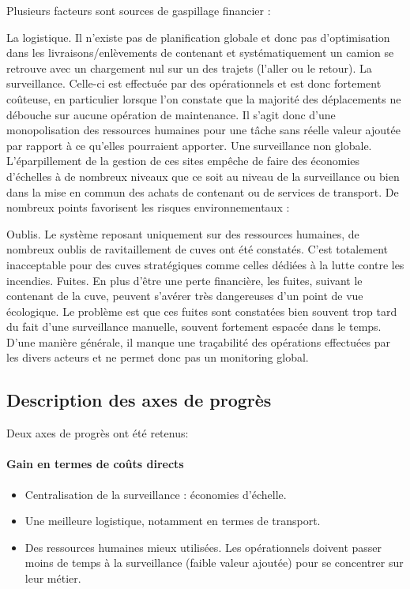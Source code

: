 \documentclass[a4paper]{article}
\begin{document}
Plusieurs facteurs sont sources de gaspillage financier :

La logistique. Il n'existe pas de planification globale et donc pas d'optimisation dans les livraisons/enlèvements de contenant et systématiquement un camion se retrouve avec un chargement nul sur un des trajets (l'aller ou le retour).
La surveillance. Celle-ci est effectuée par des opérationnels et est donc fortement coûteuse, en particulier lorsque l'on constate que la majorité des déplacements ne débouche sur aucune opération de maintenance. Il s'agit donc d'une monopolisation des ressources humaines pour une tâche sans réelle valeur ajoutée par rapport à ce qu'elles pourraient apporter.
Une surveillance non globale. L'éparpillement de la gestion de ces sites empêche de faire des économies d'échelles à de nombreux niveaux que ce soit au niveau de la surveillance ou bien dans la mise en commun des achats de contenant ou de services de transport.
De nombreux points favorisent les risques environnementaux :

Oublis. Le système reposant uniquement sur des ressources humaines, de nombreux oublis de ravitaillement de cuves ont été constatés. C'est totalement inacceptable pour des cuves stratégiques comme celles dédiées à la lutte contre les incendies.
Fuites. En plus d'être une perte financière, les fuites, suivant le contenant de la cuve, peuvent s'avérer très dangereuses d'un point de vue écologique. Le problème est que ces fuites sont constatées bien souvent trop tard du fait d'une surveillance manuelle, souvent fortement espacée dans le temps.
D'une manière générale, il manque une traçabilité des opérations effectuées par les divers acteurs et ne permet donc pas un monitoring global.

\subsection{Description des axes de progrès}

Deux axes de progrès ont été retenus:

\paragraph{Gain en termes de coûts directs}

\begin{itemize}
\item Centralisation de la surveillance : économies d'échelle.
\item Une meilleure logistique, notamment en termes de transport.
\item Des ressources humaines mieux utilisées. Les opérationnels doivent passer moins de temps à la surveillance (faible valeur ajoutée) pour se concentrer sur leur métier.
\end{itemize}
\end{document}
